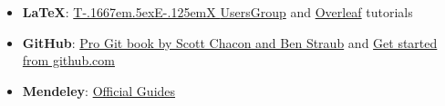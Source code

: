 \documentclass[a4paper,12pt]{article} %
\def\TeX{{\rm T\kern-.1667em\lower.5ex\hbox{E}\kern-.125emX }}
\begin{document}
\begin{center}
\begin{tcolorbox}[width=\textwidth, colback={white}, title={\textbf{Recommended resources}}, colbacktitle=white, coltitle=black]
	\begin{itemize}
	\item \textbf{LaTeX}: \href{https://tug.org/begin.html}{\TeX UsersGroup} and \href{https://www.overleaf.com/learn/latex/Learn_LaTeX_in_30_minutes}{Overleaf} tutorials
	\item \textbf{GitHub}: \href{https://git-scm.com/book/en/v2}{Pro Git book by Scott Chacon and Ben Straub} and \href{https://docs.github.com/en/get-started}{Get started from github.com}
	\item \textbf{Mendeley}: \href{https://www.mendeley.com/guides}{Official Guides}
	
\end{itemize}
	
\end{tcolorbox}%

\end{center}
\end{document}
